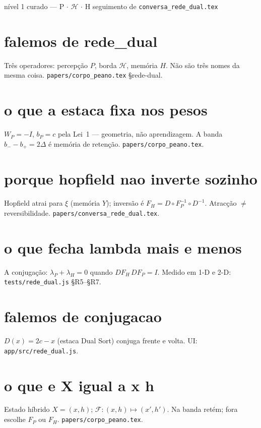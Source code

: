 \documentclass[11pt,a4paper]{article}
\newcommand{\code}[1]{\texttt{\small #1}}
\begin{document}
       {nível 1 curado --- P $\cdot$ $\mathcal{H}$ $\cdot$ H}
       {seguimento de \code{conversa\_rede\_dual.tex}}
\maketitle
\begin{abstract}
Follow-ups curtos sobre a rede neural dual.
Fonte: \code{papers/corpo\_peano.tex} \S rede-dual;
medidor \code{tests/rede\_dual.js}.
\end{abstract}

\section{falemos de rede\_dual}
Três operadores: percepção $P$, borda $\mathcal{H}$, memória $H$.
Não são três nomes da mesma coisa.
\code{papers/corpo\_peano.tex} \S rede-dual.

\section{o que a estaca fixa nos pesos}
$W_P=-I$, $b_P=c$ pela Lei~1 --- geometria, não aprendizagem.
A banda $b_{-}-b_{+}=2\Delta$ é memória de retenção.
\code{papers/corpo\_peano.tex}.

\section{porque hopfield nao inverte sozinho}
Hopfield atrai para $\xi$ (memória $Y$); inversão é $F_H=D\circ F_P^{-1}\circ D^{-1}$.
Atracção $\neq$ reversibilidade.
\code{papers/conversa\_rede\_dual.tex}.

\section{o que fecha lambda mais e menos}
A conjugação: $\lambda_P+\lambda_H=0$ quando $DF_H\,DF_P=I$.
Medido em 1-D e 2-D: \code{tests/rede\_dual.js} §R5--§R7.

\section{falemos de conjugacao}
$D(x)=2c-x$ (estaca Dual Sort) conjuga frente e volta.
UI: \code{app/src/rede\_dual.js}.

\section{o que e X igual a x h}
Estado híbrido $X=(x,h)$; $\mathcal{F}\colon(x,h)\mapsto(x',h')$.
Na banda retém; fora escolhe $F_P$ ou $F_H$.
\code{papers/corpo\_peano.tex}.
\end{document}
